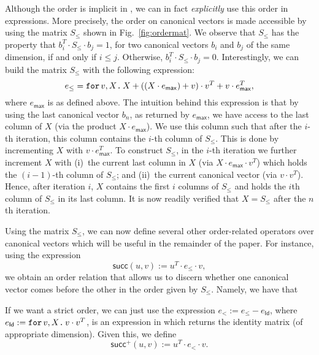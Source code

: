 Although the order is implicit in \langfor, we can in fact \textit{explicitly} use this order in \langfor expressions. More precisely, the order on canonical vectors is made accessible by
using the matrix $S_\leq$ shown in Fig.~\ref{fig:ordermat}.
We observe that $S_{\leq}$ has the property that $b_i^T\cdot S_{\leq} \cdot b_j=1$, for two canonical vectors $b_i$ and $b_j$ of the same dimension, if and only if $i\leq j$. Otherwise, $b_i^T\cdot S_{\leq} \cdot b_j=0$. 
Interestingly, we can build the matrix $S_{\leq}$ with the following \langfor expression:
$$
e_{\leq}=\texttt{for}\, v,X \texttt{.}\, X + \left((X\cdot e_{\mathsf{max}}) + v \right)\cdot v^T + v\cdot e^T_{\mathsf{max}},
$$
where $e_{\mathsf{max}}$ is as defined above. The intuition behind this expression is that by using the last canonical vector $b_n$, as returned by $e_{\mathsf{max}}$, we have access to the last column of $X$ (via the product $X\cdot e_{\mathsf{max}}$). We use this column such that after the $i$-th iteration, this column contains the $i$-th column of $S_{\leq}$. This is done by incrementing $X$ with $v\cdot e_{\mathsf{max}}^T$.
To construct $S_{\leq}$, in the $i$-th iteration we further increment $X$ with 
(i)~the current last column in $X$ (via $X\cdot e_{\mathsf{max}}\cdot v^T$) which holds
the $(i-1)$-th column of $S_{\leq}$; and (ii)~the current canonical vector (via $v\cdot v^T$). Hence, after iteration $i$, $X$ contains the first $i$ columns of $S_{\leq}$ and holds the $i$th column of $S_{\leq}$ in its last column. It is now readily verified that $X=S_{\leq}$ after the $n$th iteration.

Using the matrix $S_\leq$, we can now define several other order-related operators over canonical vectors which will be useful in the remainder of the paper. For instance, using the expression 
$$
\mathsf{succ}(u,v) := u^T\cdot e_{\leq} \cdot v,
$$
we obtain an order relation that allows us to discern whether one canonical vector comes before 
the other in the order given by $S_{\leq}$. Namely, we have that 

If we want a strict order, we can just use the expression
$e_< := e_{\leq} - e_{\mathsf{Id}}$, where $e_{\mathsf{Id}} := \texttt{for}\, v,X \texttt{.}\, v\cdot v^T$, is an expression in \langfor which returns the identity matrix (of appropriate dimension). Given this, we define
$$\mathsf{succ}^+(u,v) := u^T\cdot e_{<} \cdot v.$$

